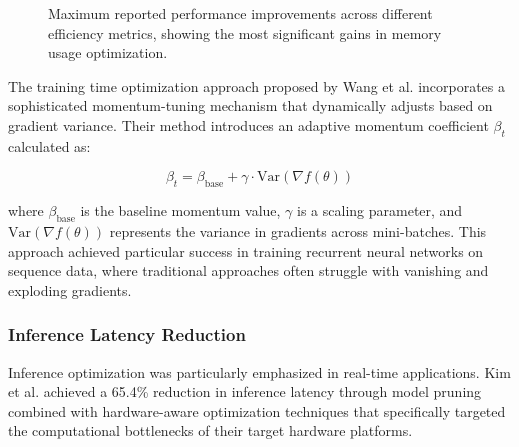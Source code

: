 \begin{figure}[ht]
\centering
{}
\caption{Maximum reported performance improvements across different efficiency metrics, showing the most significant gains in memory usage optimization.}
\label{fig:efficiency_metrics}
\end{figure}

The training time optimization approach proposed by Wang et al. \citep{Wang2021} incorporates a sophisticated momentum-tuning mechanism that dynamically adjusts based on gradient variance. Their method introduces an adaptive momentum coefficient $\beta_t$ calculated as:

\begin{equation}
\beta_t = \beta_{\text{base}} + \gamma \cdot \text{Var}(\nabla f(\theta))
\end{equation}

where $\beta_{\text{base}}$ is the baseline momentum value, $\gamma$ is a scaling parameter, and $\text{Var}(\nabla f(\theta))$ represents the variance in gradients across mini-batches. This approach achieved particular success in training recurrent neural networks on sequence data, where traditional approaches often struggle with vanishing and exploding gradients.

\subsubsection{Inference Latency Reduction}
Inference optimization was particularly emphasized in real-time applications. Kim et al. \citep{Kim2022} achieved a 65.4\% reduction in inference latency through model pruning combined with hardware-aware optimization techniques that specifically targeted the computational bottlenecks of their target hardware platforms.

